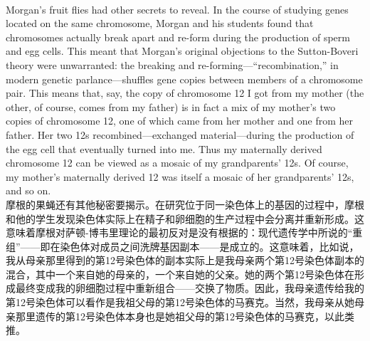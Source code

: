 \documentclass{article}
\begin{document}
\\
Morgan's fruit flies had other secrets to reveal. In the course of studying genes located on the same chromosome, Morgan and his students found that chromosomes actually break apart and re-form during the production of sperm and egg cells. This meant that Morgan's original objections to the Sutton-Boveri theory were unwarranted: the breaking and re-forming—“recombination,” in modern genetic parlance—shuffles gene copies between members of a chromosome pair. This means that, say, the copy of chromosome 12 I got from my mother (the other, of course, comes from my father) is in fact a mix of my mother’s two copies of chromosome 12, one of which came from her mother and one from her father. Her two 12s recombined—exchanged material—during the production of the egg cell that eventually turned into me. Thus my maternally derived chromosome 12 can be viewed as a mosaic of my grandparents’ 12s. Of course, my mother's maternally derived 12 was itself a mosaic of her grandparents’ 12s, and so on.\\
摩根的果蝇还有其他秘密要揭示。在研究位于同一染色体上的基因的过程中，摩根和他的学生发现染色体实际上在精子和卵细胞的生产过程中会分离并重新形成。这意味着摩根对萨顿-博韦里理论的最初反对是没有根据的：现代遗传学中所说的“重组”——即在染色体对成员之间洗牌基因副本——是成立的。这意味着，比如说，我从母亲那里得到的第12号染色体的副本实际上是我母亲两个第12号染色体副本的混合，其中一个来自她的母亲的，一个来自她的父亲。她的两个第12号染色体在形成最终变成我的卵细胞过程中重新组合——交换了物质。因此，我母亲遗传给我的第12号染色体可以看作是我祖父母的第12号染色体的马赛克。当然，我母亲从她母亲那里遗传的第12号染色体本身也是她祖父母的第12号染色体的马赛克，以此类推。\\
\end{document}
